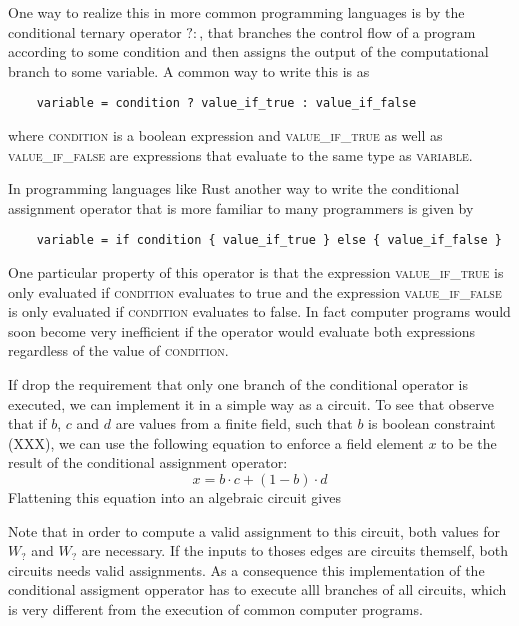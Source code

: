 One way to realize this in more common programming languages is by the conditional ternary operator $?:$, that branches the control flow of a program according to some condition and then assigns the output of the computational branch to some variable. A common way to write this is as
\begin{lstlisting}
	variable = condition ? value_if_true : value_if_false  
\end{lstlisting}
where \textsc{condition} is a boolean expression and \textsc{value\_if\_true} as well as \textsc{value\_if\_false} are expressions that evaluate to the same type as \textsc{variable}.

In programming languages like Rust another way to write the conditional assignment operator that is more familiar to many programmers is given by 
\begin{lstlisting}
	variable = if condition { value_if_true } else { value_if_false } 
\end{lstlisting}
One particular property of this operator is that the expression \textsc{value\_if\_true} is only evaluated if \textsc{condition} evaluates to true and the expression \textsc{value\_if\_false} is only evaluated if \textsc{condition} evaluates to false. In fact computer programs would soon become very inefficient if the operator would evaluate both expressions regardless of the value of \textsc{condition}.

If drop the requirement that only one branch of the conditional operator is executed, we can implement it in a simple way as a circuit. To see that observe that if $b$, $c$ and $d$ are values from a finite field, such that $b$ is boolean constraint (XXX), we can use the following equation to enforce a field element $x$ to be the result of the conditional assignment operator: 
\begin{equation}
x = b\cdot c + (1-b)\cdot d
\end{equation}
Flattening this equation into an algebraic circuit gives
\begin{center}
\end{center}
Note that in order to compute a valid assignment to this circuit, both values for $W_?$ and $W_?$ are necessary. If the inputs to thoses edges are circuits themself, both circuits needs valid assignments. As a consequence this implementation of the conditional assigment opperator has to execute alll branches of all circuits, which is very different from the execution of common computer programs. 

